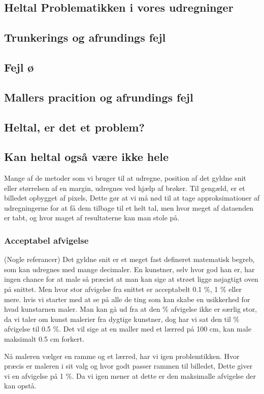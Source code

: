 \subsection*{Heltal Problematikken i vores udregninger}
\subsection*{Trunkerings og afrundings fejl}
\subsection*{Fejl ø}
\subsection*{Mallers pracition og afrundings fejl}
\subsection*{Heltal, er det et problem?}
\subsection*{Kan heltal også være ikke hele}
Mange af de metoder som vi bruger til at udregne, position af det gyldne
snit eller størrelsen af en margin, udregnes ved hjælp af brøker.
Til gengæld, er et billedet opbygget af pixels, Dette gør at vi må nød
til at tage approksimationer af udregningerne for at få dem tilbage til et
helt tal, men hvor meget af dataenden er tabt, og hvor maget af
resultaterne kan man stole på.

\subsubsection{Acceptabel afvigelse}
(Nogle referancer)
Det gyldne snit er et meget fast defineret matematisk begreb, som kan
udregnes med mange decimaler. En kunstner, selv hvor god han er, har
ingen chance for at male så præcist at man kan sige at strøet ligge
nøjagtigt oven på snittet. Men hvor stor afvigelse fra snittet er
acceptabelt 0.1 \%, 1 \% eller mere. hvis vi starter med at se på alle
de ting som kan skabe en usikkerhed for hvad kunstarnen maler. Man kan
gå ud fra at den \% afvigelse ikke er særlig stor, da vi taler om kunst
malerier fra dygtige kunstner, dog har vi sat den til \% afvigelse til
0.5 \%. Det vil sige at en maller med et lærred på 100 cm, kan male
maksimalt 0.5 cm forkert.

Nå maleren vælger en ramme og et lærred, har vi igen problemtikken. Hvor
præcis er maleren i sit valg og hvor godt passer rammen til billedet,
Dette giver vi en afvigelse på 1 \%. Da vi igen mener at dette er den
maksimalle afvigelse der kan opstå.

